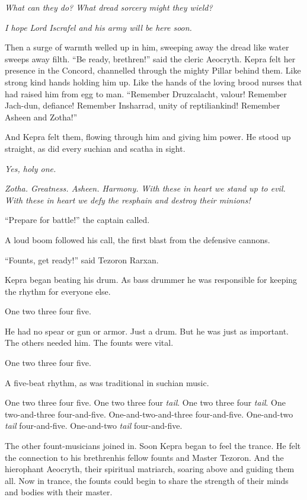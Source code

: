 \documentclass
  [a4paper,
   12pt,
   oneside
  ]%
  {article}
\newcommand{\drum}[1]{\textsf{#1}}
\begin{document}
\emph{What can they do? What dread sorcery might they wield?} 

\emph{I hope Lord Iscrafel and his army will be here soon.}

Then a surge of warmth welled up in him, sweeping away the dread like water sweeps away filth. 
``Be ready, brethren!'' said the cleric Aeocryth. 
Kepra felt her presence in the Concord, channelled through the mighty Pillar behind them. 
Like strong kind hands holding him up. 
Like the hands of the loving brood nurses that had raised him from egg to man.
``Remember Druzcalacht, valour! Remember Jach-dun, defiance! Remember Insharrad, unity of reptiliankind! Remember Asheen and Zotha!'' 

And Kepra felt them, flowing through him and giving him power. He stood up straight, as did every suchian and scatha in sight. 

\emph{Yes, holy one.}

\emph{Zotha. Greatness. Asheen. Harmony. With these in heart we stand up to evil. With these in heart we defy the resphain and destroy their minions!}

``Prepare for battle!'' the captain called.

A loud boom followed his call, the first blast from the defensive cannons. 

``Founts, get ready!'' said Tezoron Rarxan. 

Kepra began beating his drum. As bass drummer he was responsible for keeping the rhythm for everyone else.

\drum{One two three four five.} 

He had no spear or gun or armor. Just a drum. 
But he was just as important.
The others needed him. 
The founts were vital. 

\drum{One two three four five.}

A five-beat rhythm, as was traditional in suchian music. 

\drum{%
    One two three four five. One two three four \emph{tail}. One two three four \emph{tail}. One two-and-three four-and-five. One-and-two-and-three four-and-five. One-and-two \emph{tail} four-and-five. One-and-two \emph{tail} four-and-five.}

The other fount-musicians joined in. 
Soon Kepra began to feel the trance. 
He felt the connection to his brethren\dash{}his fellow founts and Master Tezoron. And the hierophant Aeocryth, their spiritual matriarch, soaring above and guiding them all. 
Now in trance, the founts could begin to share the strength of their minds and bodies with their master.
\end{document}
